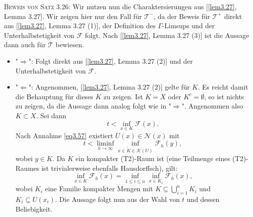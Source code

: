 \textsc{Beweis von Satz 3.26:} Wir nutzen nun die Charaktersierungen aus [\ref{lem3.27}, Lemma 3.27]. Wir zeigen hier nur den Fall für \(\mathcal{T}^-\), da der Beweis für \(\mathcal{T}^+\) direkt aus [\ref{lem3.27}, Lemma 3.27 (1)], der Definition des \(\Gamma\)-Limsups und der Unterhalbstetigkeit von \(\mathcal{F}\) folgt. Nach [\ref{lem3.27}, Lemma 3.27 (3)] ist die Aussage dann auch für \(\mathcal{T}\) bewiesen.\\
\begin{itemize}
    \item "\(\Rightarrow\)": Folgt direkt aus [\ref{lem3.27}, Lemma 3.27 (2)] und der Unterhalbstetigkeit von \(\mathcal{F}\).
    \item "\(\Leftarrow\)": Angenommen, [\ref{lem3.27}, Lemma 3.27 (2)] gelte für \(K\). Es reicht damit die Behauptung für dieses \(K\) zu zeigen. Ist \(K = X\) oder \(K^c = \emptyset\), so ist nichts zu zeigen, da die Aussage dann analog folgt wie in "\(\Rightarrow\)". Angenommen also \(K \subset X\). Sei dann 
    \begin{equation}
        t < \inf_{x \in K} \mathcal{F}(x).    
    \end{equation} 
    Nach Annahme \eqref{eq3.57} existiert \(U(x) \in \mathcal{N}(x)\) mit
    \begin{equation}
        t < \liminf_{h \to \infty} \inf_{x \in \tilde{K} \in \mathcal{K}(U)} \mathcal{F}_h(y),
    \end{equation}
    wobei \(y \in K\). Da \(K\) ein kompakter (T2)-Raum ist (eine Teilmenge eines (T2)-Raumes ist trivialerweise ebenfalls Hausdorffsch), gilt:
    \begin{equation}
        \inf_{x \in K} \mathcal{F}_h (x) = \inf_{1 \leq i \leq n} \inf_{x \in K_i} \mathcal{F}_h (x),
    \end{equation}
    wobei \(K_i\) eine Familie kompakter Mengen mit \(K \subseteq \bigcup_{i=1}^n K_i\) und \(K_i \subseteq U(x_i)\). Die Aussage folgt nun aus der Wahl von \(t\) und dessen Beliebigkeit. \QEDB
\end{itemize}